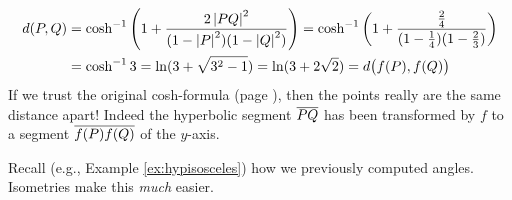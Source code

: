 \begin{example}{}{}
\begin{gather*}
\begin{aligned}
			d(P,Q)&=\cosh^{-1}\left(1+\frac{2\left| PQ\right|^2}{(1-\left| P\right|^2)(1-\left| Q\right|^2)}\right) =\cosh^{-1}\left(1+\frac{\frac 24}{(1-\frac 14)(1-\frac 23)}\right)\\
			&=\cosh^{-1}3=\ln(3+\sqrt{3^2-1})=\ln(3+2\sqrt 2) =d\bigl(f(P),f(Q)\bigr)
		\end{aligned}
	\end{gather*}
	If we trust the original cosh-formula (page \pageref{lemm:distformula}), then the points really are the same distance apart! Indeed the hyperbolic segment \textcolor{red}{$\overline{PQ}$} %
	has been transformed by $f$ to a segment \textcolor{Green}{$\overline{f(P)f(Q)}$} of the $y$-axis.
\end{example}


\goodbreak

Recall (e.g.,{} Example \ref{ex:hypisosceles}) how we previously computed angles. Isometries make this \emph{much} easier. 

